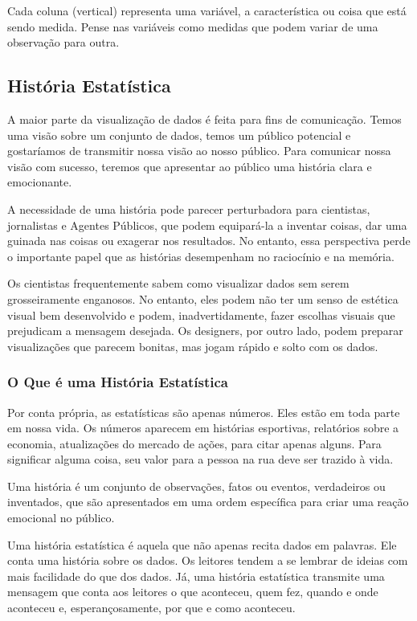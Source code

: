 Cada coluna (vertical) representa uma variável, a característica ou coisa que está sendo medida. Pense nas variáveis como medidas que podem variar de uma observação para outra.



\subsection{História Estatística}

A maior parte da visualização de dados é feita para fins de comunicação. Temos uma visão sobre um conjunto de dados, temos um público potencial e gostaríamos de transmitir nossa visão ao nosso público. Para comunicar nossa visão com sucesso, teremos que apresentar ao público uma história clara e emocionante. \vskip0.3cm

A necessidade de uma história pode parecer perturbadora para cientistas, jornalistas e Agentes Públicos, que podem equipará-la a inventar coisas, dar uma guinada nas coisas ou exagerar nos resultados. No entanto, essa perspectiva perde o importante papel que as histórias desempenham no raciocínio e na memória.\vskip0.3cm

Os cientistas frequentemente sabem como visualizar dados sem serem grosseiramente enganosos. No entanto, eles podem não ter um senso de estética visual bem desenvolvido e podem, inadvertidamente, fazer escolhas visuais que prejudicam a mensagem desejada. Os designers, por outro lado, podem preparar visualizações que parecem bonitas, mas jogam rápido e solto com os dados. 

\subsubsection{O Que é uma História Estatística}

Por conta própria, as estatísticas são apenas números. Eles estão em toda parte em nossa vida. Os números aparecem em histórias esportivas, relatórios sobre a economia, atualizações do mercado de ações, para citar apenas alguns. Para significar alguma coisa, seu valor para a pessoa na rua deve ser trazido à vida.\vskip0.3cm 

Uma história é um conjunto de observações, fatos ou eventos, verdadeiros ou inventados, que são apresentados em uma ordem específica para criar uma reação emocional no público.\vskip0.3cm 

Uma história estatística é aquela que não apenas recita dados em palavras. Ele conta uma história sobre os dados. Os leitores tendem a se lembrar de ideias com mais facilidade do que dos dados. Já, uma história estatística transmite uma mensagem que conta aos leitores o que aconteceu, quem fez, quando e onde aconteceu e, esperançosamente, por que e como aconteceu.\vskip0.3cm 


